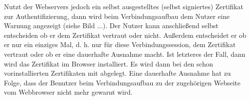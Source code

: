 \noindent
Nutzt der Webservers jedoch ein selbst ausgestelltes (selbst signiertes) Zertifikat zur Authentifizierung, dann wird beim Verbindungsaufbau dem Nutzer eine Warnung angezeigt (siehe Bild ...). Der Nutzer kann anschließend selbst entscheiden ob er dem Zertifikat vertraut oder nicht. Außerdem entscheidet er ob er nur ein einziges Mal, d. h. nur für diese Verbindungssession, dem Zertifikat vertraut oder ob er eine dauerhafte Ausnahme macht. Ist letzteres der Fall, dann wird das Zertifikat im Browser installiert. Es wird dann bei den schon vorinstallierten Zertifikaten mit abgelegt. Eine dauerhafte Ausnahme hat zu Folge, dass der Benutzer beim Verbindungsaufbau zu der zugehörigen Webseite vom Webbrowser nicht mehr gewarnt wird. 